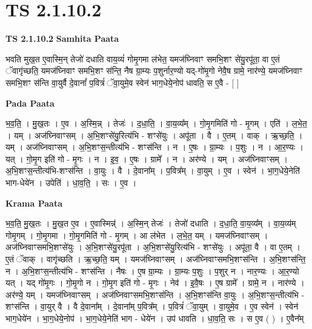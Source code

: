 \documentclass[17pt]{extarticle}
\begin{document}
\section{ TS 2.1.10.2 }

\textbf{TS 2.1.10.2 } \newline
\textbf{Samhita Paata} \newline

भवति मुख॒त ए॒वास्मि॒न् तेजो॑ दधाति वाय॒व्यं॑ गोमृ॒गमा ल॑भेत॒ यमज॑घ्निवाꣳ समभि॒शꣳ से॑यु॒रपू॑ता॒ वा ए॒तं ॅवागृ॑च्छति॒ यमज॑घ्निवाꣳ समभि॒शꣳ स॑न्ति॒ नैष ग्रा॒म्यः प॒शुर्नार॒ण्यो यद्-गो॑मृ॒गो नेवै॒ष ग्रामे॒ नार॑ण्ये॒ यमज॑घ्निवाꣳ समभि॒शꣳ स॑न्ति वा॒युर्वै दे॒वानां᳚ प॒वित्रं॑ ॅवा॒युमे॒व स्वेन॑ भाग॒धेये॒नोप॑ धावति॒ स ए॒वै - [  ] \newline

\textbf{Pada Paata} \newline

भ॒व॒ति॒ । मु॒ख॒तः । ए॒व । अ॒स्मि॒न्न् । तेजः॑ । द॒धा॒ति॒ । वा॒य॒व्य᳚म् । गो॒मृ॒गमिति॑ गो - मृ॒गम् । एति॑ । ल॒भे॒त॒ । यम् । अज॑घ्निवाꣳसम् । अ॒भि॒शꣳसे॑यु॒रित्य॑भि - शꣳसे॑युः । अपू॑ता । वै । ए॒तम् । वाक् । ऋ॒च्छ॒ति॒ । यम् । अज॑घ्निवाꣳसम् । अ॒भि॒शꣳस॒न्तीत्य॑भि - शꣳस॑न्ति । न । ए॒षः । ग्रा॒म्यः । प॒शुः । न । आ॒र॒ण्यः । यत् । गो॒मृ॒ग इति॑ गो - मृ॒गः । न । इ॒व॒ । ए॒षः । ग्रामे᳚ । न । अर॑ण्ये । यम् । अज॑घ्निवाꣳसम् । अ॒भि॒शꣳस॒न्तीत्य॑भि-शꣳस॑न्ति । वा॒युः । वै । दे॒वाना᳚म् । प॒वित्र᳚म् । वा॒युम् । ए॒व । स्वेन॑ । भा॒ग॒धेये॒नेति॑ भाग-धेये॑न । उपेति॑ । धा॒व॒ति॒ । सः । ए॒व ।  \newline


\textbf{Krama Paata} \newline

भ॒व॒ति॒ मु॒ख॒तः । मु॒ख॒त ए॒व । ए॒वास्मिन्न्॑ । अ॒स्मि॒न् तेजः॑ । तेजो॑ दधाति । द॒धा॒ति॒ वा॒य॒व्य᳚म् । वा॒य॒व्य॑म् गोमृ॒गम् । गो॒मृ॒गमा । गो॒मृ॒गमिति॑ गो - मृ॒गम् । आ ल॑भेत । ल॒भे॒त॒ यम् । यमज॑घ्निवाꣳसम् । 
अज॑घ्निवाꣳसमभि॒शꣳसे॑युः । अ॒भि॒शꣳसे॑यु॒रपू॑ता । अ॒भि॒शꣳसे॑यु॒रित्य॑भि - शꣳसे॑युः । अपू॑ता॒ वै । वा ए॒तम् । ए॒तं ॅवाक् । वागृ॑च्छति । ऋ॒च्छ॒ति॒ यम् । यमज॑घ्निवाꣳसम् । अज॑घ्निवाꣳसमभि॒शꣳस॑न्ति । अ॒भि॒शꣳस॑न्ति॒ न । अ॒भि॒शꣳस॒न्तीत्य॑भि - शꣳस॑न्ति । नैषः । ए॒ष ग्रा॒म्यः । ग्रा॒म्यः प॒शुः । प॒शुर् न । नार॒ण्यः । आ॒र॒ण्यो यत् । यद् गो॑मृ॒गः । गो॒मृ॒गो न । गो॒मृ॒ग इति॑ गो - मृ॒गः । नेव॑ । इ॒वै॒षः । ए॒ष ग्रामे᳚ । ग्रामे॒ न । नार॑ण्ये । अर॑ण्ये॒ यम् । यमज॑घ्निवाꣳसम् । अज॑घ्निवाꣳसमभि॒शꣳस॑न्ति । अ॒भि॒शꣳस॑न्ति वा॒युः । अ॒भि॒शꣳस॒न्तीत्य॑भि - शꣳस॑न्ति । वा॒युर् वै । वै दे॒वाना᳚म् । दे॒वाना᳚म् प॒वित्र᳚म् । प॒वित्रं॑ ॅवा॒युम् । वा॒युमे॒व । ए॒व स्वेन॑ । स्वेन॑ भाग॒धेये॑न । भा॒ग॒धेये॒नोप॑ । भा॒ग॒धेये॒नेति॑ भाग - धेये॑न । उप॑ धावति । धा॒व॒ति॒ सः । स ए॒व ( ) । ए॒वैन᳚म् \newline
\end{document}
